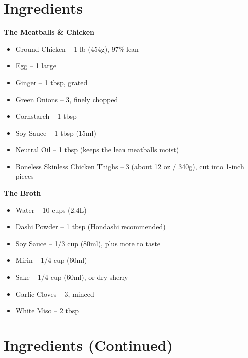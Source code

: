 




\section*{Ingredients}

\textbf{The Meatballs \& Chicken}
\begin{itemize}[itemsep=0.1em, label={\raisebox{-0.1ex}{\large\textbullet}}]
      \item Ground Chicken – 1 lb (454g), 97\% lean
      \item Egg – 1 large
      \item[\cut] Ginger – 1 tbsp, grated
      \item[\cut] Green Onions – 3, finely chopped
      \item[\measure] Cornstarch – 1 tbsp
      \item[\measure] Soy Sauce – 1 tbsp (15ml)
      \item[\measure] Neutral Oil – 1 tbsp (keeps the lean meatballs moist)
      \item[\cut] Boneless Skinless Chicken Thighs – 3 (about 12 oz / 340g), cut into 1-inch pieces
\end{itemize}

\textbf{The Broth}
\begin{itemize}[itemsep=0.1em, label={\raisebox{-0.1ex}{\large\textbullet}}]
      \item[\measure] Water – 10 cups (2.4L)
      \item[\measure] Dashi Powder – 1 tbsp (Hondashi recommended)
      \item[\measure] Soy Sauce – 1/3 cup (80ml), plus more to taste
      \item[\measure] Mirin – 1/4 cup (60ml)
      \item[\measure] Sake – 1/4 cup (60ml), or dry sherry
      \item[\cut] Garlic Cloves – 3, minced
      \item[\measure] White Miso – 2 tbsp
\end{itemize}

\newpage
{}
\section*{Ingredients (Continued)}

